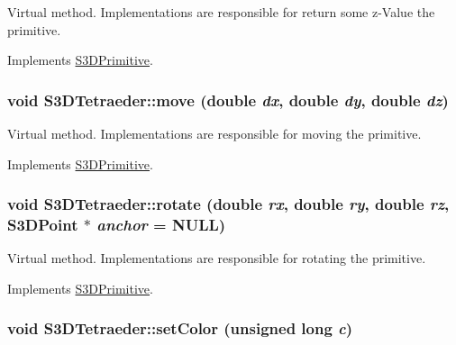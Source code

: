 Virtual method. Implementations are responsible for return some z-\/Value the primitive. 



Implements \hyperlink{class_s3_d_primitive_ab5b06d3a8e83216cc42554bb78afd2d9}{S3DPrimitive}.

\hypertarget{class_s3_d_tetraeder_a3acda1d545e2f078abf299b1c424b7bc}{
\subsubsection[{move}]{\setlength{\rightskip}{0pt plus 5cm}void S3DTetraeder::move (double {\em dx}, \/  double {\em dy}, \/  double {\em dz})}}
\label{class_s3_d_tetraeder_a3acda1d545e2f078abf299b1c424b7bc}


Virtual method. Implementations are responsible for moving the primitive. 



Implements \hyperlink{class_s3_d_primitive_a73a178ec2e1aa8e95f01baf0552724a9}{S3DPrimitive}.

\hypertarget{class_s3_d_tetraeder_aa06cc6b851e9a3abce9f68830340007a}{
\subsubsection[{rotate}]{\setlength{\rightskip}{0pt plus 5cm}void S3DTetraeder::rotate (double {\em rx}, \/  double {\em ry}, \/  double {\em rz}, \/  {\bf S3DPoint} $\ast$ {\em anchor} = {\ttfamily NULL})}}
\label{class_s3_d_tetraeder_aa06cc6b851e9a3abce9f68830340007a}


Virtual method. Implementations are responsible for rotating the primitive. 



Implements \hyperlink{class_s3_d_primitive_a23eb36b6bd48643e8f7be4b950592d9e}{S3DPrimitive}.

\hypertarget{class_s3_d_tetraeder_a99856377365e5c26c1f86155909725ed}{
\subsubsection[{setColor}]{\setlength{\rightskip}{0pt plus 5cm}void S3DTetraeder::setColor (unsigned long {\em c})}}
\label{class_s3_d_tetraeder_a99856377365e5c26c1f86155909725ed}


